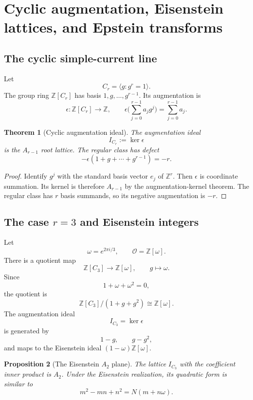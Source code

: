 \documentclass[11pt]{amsart}
\newtheorem{theorem}{Theorem}[section]
\newtheorem{proposition}[theorem]{Proposition}
\newcommand{\ZZ}{\mathbb Z}
\newcommand{\OO}{\mathcal O}
\begin{document}
\section{Cyclic augmentation, Eisenstein lattices, and Epstein transforms}

\subsection{The cyclic simple-current line}

Let
\[
        C_r=\langle g:g^r=1\rangle.
\]
The group ring $\ZZ[C_r]$ has basis $1,g,\ldots,g^{r-1}$.  Its augmentation is
\[
        \epsilon:\ZZ[C_r]\to\ZZ,
        \qquad
        \epsilon\Big(\sum_{j=0}^{r-1}a_jg^j\Big)=\sum_{j=0}^{r-1}a_j.
\]

\begin{theorem}[Cyclic augmentation ideal]
The augmentation ideal
\[
        I_{C_r}:=\ker\epsilon
\]
is the $A_{r-1}$ root lattice.  The regular class has defect
\[
        -\epsilon(1+g+\cdots+g^{r-1})=-r.
\]
\end{theorem}

\begin{proof}
Identify $g^j$ with the standard basis vector $e_j$ of $\ZZ^r$.  Then $\epsilon$ is coordinate summation.  Its kernel is therefore $A_{r-1}$ by the augmentation-kernel theorem.  The regular class has $r$ basis summands, so its negative augmentation is $-r$.\end{proof}

\subsection{The case $r=3$ and Eisenstein integers}

Let
\[
        \omega=e^{2\pi i/3},
        \qquad
        \OO=\ZZ[\omega].
\]
There is a quotient map
\[
        \ZZ[C_3]\to\ZZ[\omega],
        \qquad
        g\mapsto\omega.
\]
Since
\[
        1+\omega+\omega^2=0,
\]
the quotient is
\[
        \ZZ[C_3]/(1+g+g^2)\cong\ZZ[\omega].
\]
The augmentation ideal
\[
        I_{C_3}=\ker\epsilon
\]
is generated by
\[
        1-g,
        \qquad
        g-g^2,
\]
and maps to the Eisenstein ideal $(1-\omega)\ZZ[\omega]$.

\begin{proposition}[The Eisenstein $A_2$ plane]
The lattice $I_{C_3}$ with the coefficient inner product is $A_2$.  Under the Eisenstein realization, its quadratic form is similar to
\[
        m^2-mn+n^2=N(m+n\omega).
\]
\end{proposition}
\end{document}
